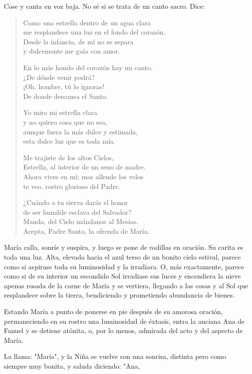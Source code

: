 \documentclass[12pt, twoside, openright]{book} %
\begin{document}
Cose y canta en voz baja. No sé si se trata de un canto sacro. Dice:

\begin{verse}
Como una estrella dentro de un agua clara\\
me resplandece una luz en el fondo del corazón.\\
Desde la infancia, de mí no se separa\\
y dulcemente me guía con amor.

En lo más hondo del corazón hay un canto. \\
¿De dónde venir podrá? \\
¡Oh, hombre, tú lo ignoras! \\
De donde descansa el Santo.

Yo miro mi estrella clara\\
y no quiero cosa que no sea,\\
aunque fuera la más dulce y estimada,\\
esta dulce luz que es toda mía. 

Me trajiste de los altos Cielos, \\
Estrella, al interior de un seno de madre.\\
Ahora vives en mí; mas allende los velos\\
te veo, rostro glorioso del Padre.

¿Cuándo a tu sierva darás el honor\\
de ser humilde esclava del Salvador? \\
Manda, del Cielo mándanos al Mesías.\\ 
Acepta, Padre Santo, la ofrenda de María.
\end{verse} 

María calla, sonríe y suspira, y luego se pone de rodillas en oración. Su carita es toda una luz. Alta, elevada hacia el azul terso de un bonito cielo estival, parece como si aspirase toda su luminosidad y la irradiara. O, más exactamente, parece como si de su interior un escondido Sol irradiase sus luces y encendiera la nieve apenas rosada de la carne de María y se vertiera, llegando a las cosas y al Sol que resplandece sobre la tierra, bendiciendo y prometiendo abundancia de bienes. 

Estando María a punto de ponerse en pie después de su amorosa oración, permaneciendo en su rostro una luminosidad de éxtasis, entra la anciana Ana de Fanuel y se detiene atónita, o, por lo menos, admirada del acto y del aspecto de María. 

La llama: "María", y la Niña se vuelve con una sonrisa, distinta pero como siempre muy bonita, y saluda diciendo: "Ana, 
\end{document}
